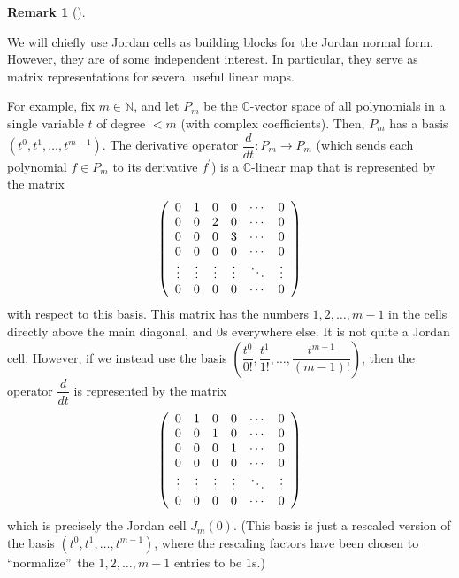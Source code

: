 \documentclass[numbers=enddot,12pt,final,onecolumn,notitlepage]{scrartcl}%
\numberwithin{exer}{subsection}
\theoremstyle{definition}
\newtheorem{remk}[theo]{Remark}
\newenvironment{remark}[1][]
{\begin{remk}[#1]\begin{leftbar}}
{\end{leftbar}\end{remk}}
\begin{document}
\begin{remark}
We will chiefly use Jordan cells as building blocks for the Jordan normal
form. However, they are of some independent interest. In particular, they
serve as matrix representations for several useful linear maps.

For example, fix $m\in\mathbb{N}$, and let $P_{m}$ be the $\mathbb{C}$-vector
space of all polynomials in a single variable $t$ of degree $<m$ (with complex
coefficients). Then, $P_{m}$ has a basis $\left(  t^{0},t^{1},\ldots
,t^{m-1}\right)  $. The derivative operator $\dfrac{d}{dt}:P_{m}\rightarrow
P_{m}$ (which sends each polynomial $f\in P_{m}$ to its derivative $f^{\prime
}$) is a $\mathbb{C}$-linear map that is represented by the matrix%
\[
\left(
\begin{array}
[c]{cccccc}%
0 & 1 & 0 & 0 & \cdots & 0\\
0 & 0 & 2 & 0 & \cdots & 0\\
0 & 0 & 0 & 3 & \cdots & 0\\
0 & 0 & 0 & 0 & \cdots & 0\\
\vdots & \vdots & \vdots & \vdots & \ddots & \vdots\\
0 & 0 & 0 & 0 & \cdots & 0
\end{array}
\right)
\]
with respect to this basis. This matrix has the numbers $1,2,\ldots,m-1$ in
the cells directly above the main diagonal, and $0$s everywhere else. It is
not quite a Jordan cell. However, if we instead use the basis $\left(
\dfrac{t^{0}}{0!},\dfrac{t^{1}}{1!},\ldots,\dfrac{t^{m-1}}{\left(  m-1\right)
!}\right)  $, then the operator $\dfrac{d}{dt}$ is represented by the matrix
\[
\left(
\begin{array}
[c]{cccccc}%
0 & 1 & 0 & 0 & \cdots & 0\\
0 & 0 & 1 & 0 & \cdots & 0\\
0 & 0 & 0 & 1 & \cdots & 0\\
0 & 0 & 0 & 0 & \cdots & 0\\
\vdots & \vdots & \vdots & \vdots & \ddots & \vdots\\
0 & 0 & 0 & 0 & \cdots & 0
\end{array}
\right)
\]
which is precisely the Jordan cell $J_{m}\left(  0\right)  $. (This basis is
just a rescaled version of the basis $\left(  t^{0},t^{1},\ldots
,t^{m-1}\right)  $, where the rescaling factors have been chosen to
\textquotedblleft normalize\textquotedblright\ the $1,2,\ldots,m-1$ entries to
be $1$s.)
\end{remark}
\end{document}

